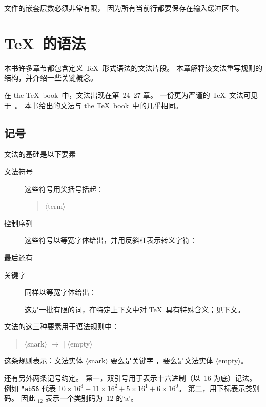\documentclass[a4paper]{rapport3}
\def\gr#1{$\langle$#1$\rangle$}\def\key#1{{\tt#1}}
\def\TeXbook{the \TeX\ book}\def\web{{\sc web}}
\newenvironment{disp}{\begin{quotation}}{\end{quotation}}
\begin{document}
\verb-- 文件的嵌套层数必须非常有限，
因为所有当前行都要保存在输入缓冲区中。


\endofchapter
\chapter{\TeX\ 的语法}\label{gramm}

本书许多章节都包含定义 \TeX\ 形式语法的文法片段。
本章解释该文法重写规则的结构，并介绍一些关键概念。

在 \TeXbook\ 中，文法出现在第~24--27 章。
一份更为严谨的 \TeX\ 文法可见于~\cite{Appelt}。
本书给出的文法与 \TeXbook\ 中的几乎相同。

\section{记号}

文法的基础是以下要素 \begin{description}\item [文法符号]
这些符号用尖括号括起：\begin{disp}\gr{term}\end{disp}
\item [控制序列]
这些符号以等宽字体给出，并用反斜杠表示转义字符：
\begin{disp}\end{disp}
\end{description}
最后还有 \begin{description}\item [关键字]
同样以等宽字体给出：\begin{disp}\end{disp}
这是一批有限的词，在特定上下文中对 \TeX\ 具有特殊含义；见下文。\end{description}

文法的这三种要素用于语法规则中：
\begin{disp}\gr{snark} $\longrightarrow$  $|$ \gr{empty}
\end{disp}
这条规则表示：文法实体 \gr{snark}
要么是关键字 ，要么是文法实体 \gr{empty}。

还有另外两条记号约定。
第一，双引号用于表示十六进制（以~16 为底）记法。
例如 \verb>"ab56> 代表 $10\times16^3+11\times16^2
+5\times16^1+6\times16^0$。
第二，用下标表示类别码。
因此 $_{12}$ 表示一个类别码为~12 的`a'。
\end{document}
